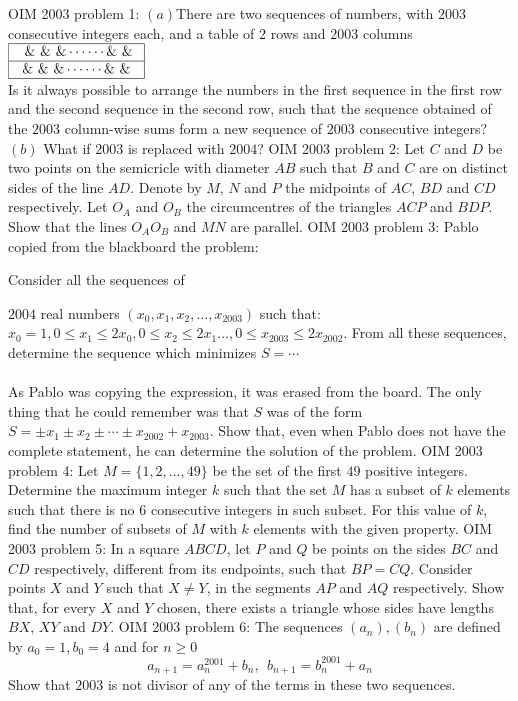 OIM 2003 problem 1:  $(a)$There are two sequences of numbers, with $2003$ consecutive integers each, and a table of $2$ rows and $2003$ columns \\
$
\begin{array}{|c|c|c|c|c|c|} \hline\ \ \&\ \&\ \&\cdots\cdots\&\ \&\ \\ \hline \ \&\ \&\ \&\cdots\cdots\&\ \&\ \\ \hline \end{array}
$ \\
Is it always possible to arrange the numbers in the first sequence in the first row and the second sequence in the second row, such that the sequence obtained of the $2003$ column-wise sums form a new sequence of $2003$ consecutive integers? \\
$(b)$ What if $2003$ is replaced with $2004$? 
OIM 2003 problem 2:  Let $C$ and $D$ be two points on the semicricle with diameter $AB$ such that $B$ and $C$ are on distinct sides of the line $AD$. Denote by $M$, $N$ and $P$ the midpoints of $AC$, $BD$ and $CD$ respectively. Let $O_A$ and $O_B$ the circumcentres of the triangles $ACP$ and $BDP$. Show that the lines $O_AO_B$ and $MN$ are parallel. 
OIM 2003 problem 3:  Pablo copied from the blackboard the problem:
\begin{itemize}
Consider all the sequences of\end{itemize}
$2004$ real numbers $(x_0,x_1,x_2,\dots, x_{2003})$ such that: $x_0=1, 0\le x_1\le 2x_0,0\le x_2\le 2x_1\ldots ,0\le x_{2003}\le 2x_{2002}$. From all these sequences, determine the sequence which minimizes $S=\cdots$ \\\\
As Pablo was copying the expression, it was erased from the board. The only thing that he could remember was that $S$ was of the form $S=\pm x_1\pm x_2\pm\cdots\pm x_{2002}+x_{2003}$. Show that, even when Pablo does not have the complete statement, he can determine the solution of the problem. 
OIM 2003 problem 4:  Let $M=\{1,2,\dots,49\}$ be the set of the first $49$ positive integers. Determine the maximum integer $k$ such that the set $M$ has a subset of $k$ elements such that there is no $6$ consecutive integers in such subset. For this value of $k$, find the number of subsets of $M$ with $k$ elements with the given property. 
OIM 2003 problem 5:  In a square $ABCD$, let $P$ and $Q$ be points on the sides $BC$ and $CD$ respectively, different from its endpoints, such that $BP=CQ$. Consider points $X$ and $Y$ such that $X\neq Y$, in the segments $AP$ and $AQ$ respectively. Show that, for every $X$ and $Y$ chosen, there exists a triangle whose sides have lengths $BX$, $XY$ and $DY$. 
OIM 2003 problem 6:  The sequences $(a_n),(b_n)$ are defined by $a_0=1,b_0=4$ and for $n\ge 0$
\[ a_{n+1}=a_n^{2001}+b_n,\ \ b_{n+1}=b_n^{2001}+a_n \]
Show that $2003$ is not divisor of any of the terms in these two sequences. 

